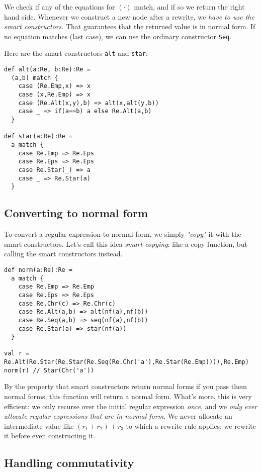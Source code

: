 We check if any of the equations for $(\cdot)$ match, and if so we return the right hand side. Whenever we construct a new node after a rewrite, we \emph{have to use the smart constructors}. That guarantees that the returned value is in normal form. If no equation matches (last case), we can use the ordinary constructor \lstinline|Seq|.

Here are the smart constructors \lstinline|alt| and \lstinline|star|:

\begin{lstlisting}
def alt(a:Re, b:Re):Re =
  (a,b) match {
    case (Re.Emp,x) => x
    case (x,Re.Emp) => x
    case (Re.Alt(x,y),b) => alt(x,alt(y,b))
    case _ => if(a==b) a else Re.Alt(a,b)
  }

def star(a:Re):Re =
  a match {
    case Re.Emp => Re.Eps
    case Re.Eps => Re.Eps
    case Re.Star(_) => a
    case _ => Re.Star(a)
  }
\end{lstlisting}

\subsection{Converting to normal form}

To convert a regular expression to normal form, we simply \emph{"copy"} it with the smart constructors.
Let's call this idea \emph{smart copying}: like a copy function, but calling the smart constructors instead.

\begin{lstlisting}
def norm(a:Re):Re =
  a match {
    case Re.Emp => Re.Emp
    case Re.Eps => Re.Eps
    case Re.Chr(c) => Re.Chr(c)
    case Re.Alt(a,b) => alt(nf(a),nf(b))
    case Re.Seq(a,b) => seq(nf(a),nf(b))
    case Re.Star(a) => star(nf(a))
  }

val r = Re.Alt(Re.Star(Re.Star(Re.Seq(Re.Chr('a'),Re.Star(Re.Emp)))),Re.Emp)
norm(r) // Star(Chr('a'))
\end{lstlisting}

By the property that smart constructors return normal forms if you pass them normal forms, this function will return a normal form. What's more, this is very efficient: we only recurse over the initial regular expression \emph{once}, and we \emph{only ever allocate regular expressions that are in normal form}. We never allocate an intermediate value like $(r_1 + r_2) + r_3$ to which a rewrite rule applies; we rewrite it before even constructing it.

\subsection{Handling commutativity}

